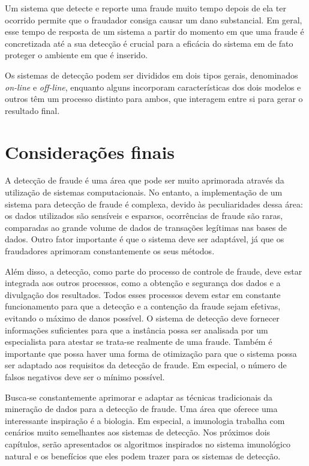 Um sistema que detecte e reporte uma fraude muito tempo depois de ela ter ocorrido permite que o fraudador consiga causar um dano substancial. Em geral, esse tempo de resposta de um sistema a partir do momento em que uma fraude é concretizada até a sua detecção é crucial para a eficácia do sistema em de fato proteger o ambiente em que é inserido.

Os sistemas de detecção podem ser divididos em dois tipos gerais, denominados \emph{on-line} e \emph{off-line}, enquanto alguns incorporam características dos dois modelos e outros têm um processo distinto para ambos, que interagem entre si para gerar o resultado final.

\section{Considerações finais}

A detecção de fraude é uma área que pode ser muito aprimorada através da utilização de sistemas computacionais. No entanto, a implementação de um sistema para detecção de fraude é complexa, devido às peculiaridades dessa área: os dados utilizados são sensíveis e esparsos, ocorrências de fraude são raras, comparadas ao grande volume de dados de transações legítimas nas bases de dados. Outro fator importante é que o sistema deve ser adaptável, já que os fraudadores aprimoram constantemente os seus métodos.

Além disso, a detecção, como parte do processo de controle de fraude, deve estar integrada aos outros processos, como a obtenção e segurança dos dados e a divulgação dos resultados. Todos esses processos devem estar em constante funcionamento para que a detecção e a contenção da fraude sejam efetivas, evitando o máximo de danos possível. O sistema de detecção deve fornecer informações suficientes para que a instância possa ser analisada por um especialista para atestar se trata-se realmente de uma fraude. Também é importante que possa haver uma forma de otimização para que o sistema possa ser adaptado aos requisitos da detecção de fraude. Em especial, o número de falsos negativos deve ser o mínimo possível.

Busca-se constantemente aprimorar e adaptar as técnicas tradicionais da mineração de dados para a detecção de fraude. Uma área que oferece uma interessante inspiração é a biologia. Em especial, a imunologia trabalha com cenários muito semelhantes aos sistemas de detecção. Nos próximos dois capítulos, serão apresentados os algoritmos inspirados no sistema imunológico natural e os benefícios que eles podem trazer para os sistemas de detecção.

